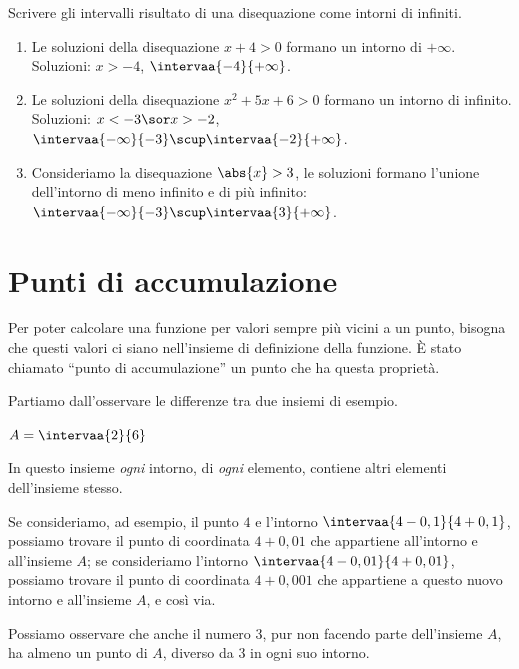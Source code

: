 \begin{esempio} Scrivere gli intervalli risultato di una disequazione come 
intorni di infiniti.
\begin{enumerate}[label=\alph*)]
\item Le soluzioni della disequazione \(x+4 > 0\) formano un intorno 
di \(+\infty\).  
Soluzioni: \(x > -4\), \(\intervaa{-4}{+\infty}\).
\item Le soluzioni della disequazione \(x^2+5x+6 > 0\) formano un 
intorno di infinito. 
Soluzioni: \(x < -3 \sor x > -2\), 
\(\intervaa{-\infty}{-3} \scup \intervaa{-2}{+\infty}\).
\item Consideriamo la disequazione \(\abs{x}>3\), 
le soluzioni formano l'unione dell'intorno di meno infinito e di più 
infinito:
\(\intervaa{-\infty}{-3} \scup \intervaa{3}{+\infty}\).
\end{enumerate} 
\end{esempio}

\section{Punti di accumulazione}
\label{sec:topologiapuntiaccumulazione}

Per poter calcolare una funzione per valori sempre più vicini a un punto, 
bisogna che questi valori ci siano nell'insieme di definizione della 
funzione. 
È stato chiamato ``punto di accumulazione'' un punto che ha questa proprietà.

Partiamo dall'osservare le differenze tra due insiemi di esempio.

\begin{esempio}
\item \(A = \intervaa{2}{6}\) 

In questo insieme \emph{ogni} intorno, di \emph{ogni} elemento, 
contiene altri elementi dell'insieme stesso.

Se consideriamo, ad esempio, il punto \(4\) e l'intorno 
\(\intervaa{4-0,1}{4+0,1}\), possiamo trovare il punto di coordinata 
\(4+0,01\) che appartiene all'intorno e all'insieme \(A\);
se consideriamo l'intorno 
\(\intervaa{4-0,01}{4+0,01}\), possiamo trovare il punto di coordinata 
\(4+0,001\) che appartiene a questo nuovo intorno e all'insieme \(A\), 
e così via.

Possiamo osservare che anche il numero \(3\), pur non facendo 
parte dell'insieme \(A\), ha almeno un punto di \(A\), diverso da \(3\) in 
ogni suo intorno.
\end{esempio}

